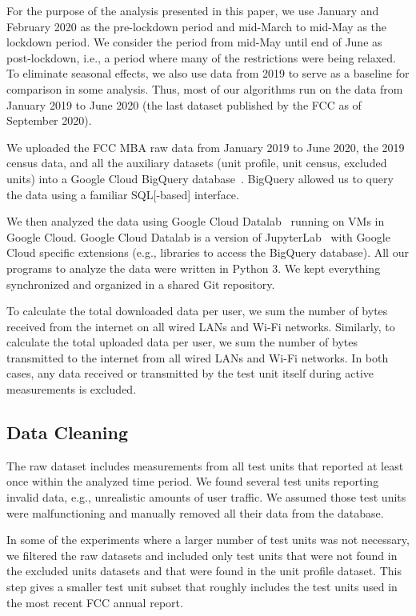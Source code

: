 \documentclass[conference,10pt]{IEEEtran}
\begin{document}
For the purpose of the analysis presented in this paper, we use January and February 2020 as the pre-lockdown period and mid-March to mid-May as the lockdown period. We consider the period from mid-May until end of June as post-lockdown, i.e., a period where many of the restrictions were being relaxed. To eliminate seasonal effects, we also use data from 2019 to serve as a baseline for comparison in some analysis. Thus, most of our algorithms run on the data from January 2019 to June 2020 (the last dataset published by the \gls{FCC} as of September 2020).

We uploaded the \gls{FCC} \gls{MBA} raw data from January 2019 to June 2020, the 2019 census data, and all the auxiliary datasets (unit profile, unit census, excluded units) into a Google Cloud BigQuery database~\cite{bigquery}. BigQuery allowed us to query the data using a familiar \gls{SQL}[-based] interface.

We then analyzed the data using Google Cloud Datalab~\cite{datalab} running on \glspl{VM} in Google Cloud. Google Cloud Datalab is a version of JupyterLab~\cite{jupyter} with Google Cloud specific extensions (e.g., libraries to access the BigQuery database). All our programs to analyze the data were written in Python 3. We kept everything synchronized and organized in a shared Git repository.

To calculate the total downloaded data per user, we sum the number of bytes received from the internet on all wired \glspl{LAN} and Wi-Fi networks. Similarly, to calculate the total uploaded data per user, we sum the number of bytes transmitted to the internet from all wired \glspl{LAN} and Wi-Fi networks. In both cases, any data received or transmitted by the test unit itself during active measurements is excluded.


\subsection{Data Cleaning}

The raw dataset includes measurements from all test units that reported at least once within the analyzed time period. We found several test units reporting invalid data, e.g., unrealistic amounts of user traffic. We assumed those test units were malfunctioning and manually removed all their data from the database.

In some of the experiments where a larger number of test units was not necessary, we filtered the raw datasets and included only test units that were not found in the excluded units datasets and that were found in the unit profile dataset. This step gives a smaller test unit subset that roughly includes the test units used in the most recent \gls{FCC} annual report.
\end{document}
